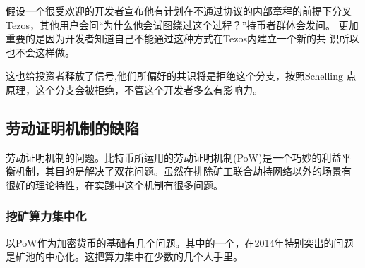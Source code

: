 \documentclass[letterpaper]{article}
\begin{document}
假设一个很受欢迎的开发者宣布他有计划在不通过协议的内部章程的前提下分叉
Tezos，其他用户会问``为什么他会试图绕过这个过程？''持币者群体会发问。
更加重要的是因为开发者知道自己不能通过这种方式在Tezos内建立一个新的共
识所以也不会这样做。

这也给投资者释放了信号,他们所偏好的共识将是拒绝这个分支，按照Schelling
点原理，这个分支会被拒绝，不管这个开发者多么有影响力。

\subsection{劳动证明机制的缺陷}

劳动证明机制的问题。比特币所运用的劳动证明机制(PoW)是一个巧妙的利益平
衡机制，其目的是解决了双花问题。虽然在排除矿工联合劫持网络以外的场景有
很好的理论特性，在实践中这个机制有很多问题。

\subsubsection{挖矿算力集中化}
以PoW作为加密货币的基础有几个问题。其中的一个，在2014年特别突出的问题
是矿池的中心化。这把算力集中在少数的几个人手里。
\end{document}
